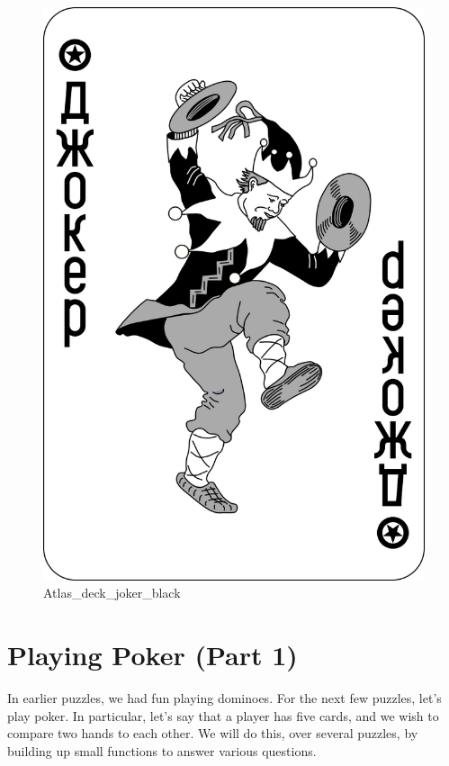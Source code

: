 \begin{figure}
\centering
\includegraphics{images/Atlas_deck_joker_black.svg}
\caption{Atlas\_deck\_joker\_black}
\end{figure}

\newpage

\hypertarget{playing-poker-part-1}{%
\section{Playing Poker (Part 1)}\label{playing-poker-part-1}}

In earlier puzzles, we had fun playing dominoes. For the next few
puzzles, let's play poker. In particular, let's say that a player has
five cards, and we wish to compare two hands to each other. We will do
this, over several puzzles, by building up small functions to answer
various questions.

